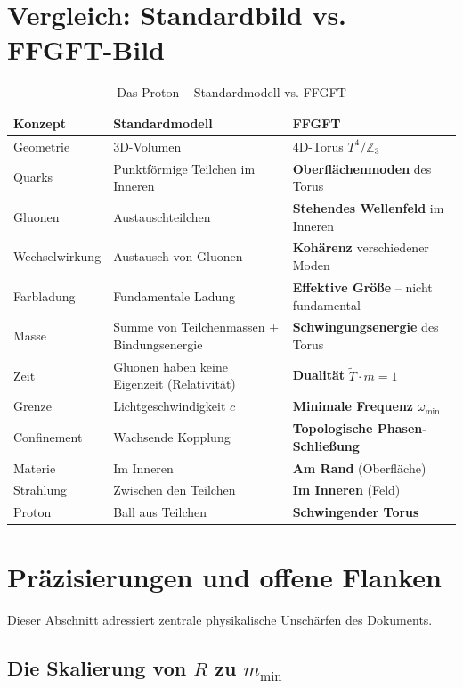\documentclass[11pt,a4paper]{article}
\begin{document}
	\section{Vergleich: Standardbild vs. FFGFT-Bild}
	
	\begin{table}[ht]
		\centering
		\caption{Das Proton -- Standardmodell vs. FFGFT}
		\label{tab:vergleich}
		\begin{tabular}{lll}
			\toprule
			Konzept & Standardmodell & FFGFT \\
			\midrule
			Geometrie & 3D-Volumen & 4D-Torus \(T^4/\mathbb{Z}_3\) \\
			Quarks & Punktförmige Teilchen im Inneren & \textbf{Oberflächenmoden} des Torus \\
			Gluonen & Austauschteilchen & \textbf{Stehendes Wellenfeld} im Inneren \\
			Wechselwirkung & Austausch von Gluonen & \textbf{Kohärenz} verschiedener Moden \\
			Farbladung & Fundamentale Ladung & \textbf{Effektive Größe} -- nicht fundamental \\
			Masse & Summe von Teilchenmassen + Bindungsenergie & \textbf{Schwingungsenergie} des Torus \\
			Zeit & Gluonen haben keine Eigenzeit (Relativität) & \textbf{Dualität} \(\tilde{T}\cdot m = 1\) \\
			Grenze & Lichtgeschwindigkeit \(c\) & \textbf{Minimale Frequenz} \(\omega_{\min}\) \\
			Confinement & Wachsende Kopplung & \textbf{Topologische Phasen-Schließung} \\
			Materie & Im Inneren & \textbf{Am Rand} (Oberfläche) \\
			Strahlung & Zwischen den Teilchen & \textbf{Im Inneren} (Feld) \\
			Proton & Ball aus Teilchen & \textbf{Schwingender Torus} \\
			\bottomrule
		\end{tabular}
	\end{table}
	
	\section{Präzisierungen und offene Flanken}
	
	Dieser Abschnitt adressiert zentrale physikalische Unschärfen des Dokuments.
	
	\subsection{Die Skalierung von \(R\) zu \(m_{\min}\)}
	
\end{document}
